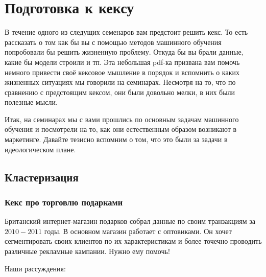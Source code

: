 \documentclass[12pt, a4paper, oneside]{article}
\begin{document}
\section*{Подготовка к кексу}

В течение одного из следущих семенаров вам предстоит решить кекс. То есть рассказать о том как бы вы с помощью методов машинного обучения попробовали бы решить жизненную проблему. Откуда бы вы брали данные, какие бы модели строили и тп. Эта небольшая pdf-ка призвана вам помочь немного привести своё кексовое мышление в порядок и вспомнить о каких жизненных ситуациях мы говорили на семинарах.  Несмотря на то, что по сравнению с предстоящим кексом, они были довольно мелки, в них были полезные мысли. 

Итак, на семинарах мы с вами прошлись по основным задачам машинного обучения и посмотрели на то, как они естественным образом возникают в маркетинге. Давайте тезисно вспомним о том, что это были за задачи в идеологическом плане. 

\subsection*{Кластеризация} 

\subsubsection*{Кекс про торговлю подарками}

Британский интернет-магазин подарков собрал данные по своим транзакциям за $2010-2011$ годы. В основном магазин работает с оптовиками.  Он хочет сегментировать своих клиентов по их характеристикам и более точечно проводить различные рекламные кампании. Нужно ему помочь! 

Наши рассуждения: 
\end{document}
